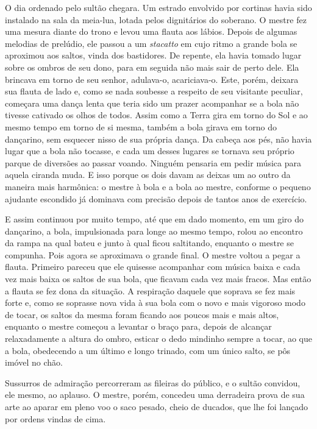 O dia ordenado pelo sultão chegara. Um estrado envolvido por cortinas
havia sido instalado na sala da meia-lua, lotada pelos dignitários do
soberano. O mestre fez uma mesura diante do trono e levou uma flauta aos
lábios. Depois de algumas melodias de prelúdio, ele passou a um
\emph{stacatto} em cujo ritmo a grande bola se aproximou aos saltos,
vinda dos bastidores. De repente, ela havia tomado lugar sobre os ombros
de seu dono, para em seguida não mais sair de perto dele. Ela brincava
em torno de seu senhor, adulava-o, acariciava-o. Este, porém, deixara
sua flauta de lado e, como se nada soubesse a respeito de seu visitante
peculiar, começara uma dança lenta que teria sido um prazer acompanhar
se a bola não tivesse cativado os olhos de todos. Assim como a Terra
gira em torno do Sol e ao mesmo tempo em torno de si mesma, também a
bola girava em torno do dançarino, sem esquecer nisso de sua própria
dança. Da cabeça aos pés, não havia lugar que a bola não tocasse, e cada
um desses lugares se tornava seu próprio parque de diversões ao passar
voando. Ninguém pensaria em pedir música para aquela ciranda muda. E
isso porque os dois davam as deixas um ao outro da maneira mais
harmônica: o mestre à bola e a bola ao mestre, conforme o pequeno
ajudante escondido já dominava com precisão depois de tantos anos de
exercício.

E assim continuou por muito tempo, até que em dado momento, em um giro
do dançarino, a bola, impulsionada para longe ao mesmo tempo, rolou ao
encontro da rampa na qual bateu e junto à qual ficou saltitando,
enquanto o mestre se compunha. Pois agora se aproximava o grande final.
O mestre voltou a pegar a flauta. Primeiro pareceu que ele quisesse
acompanhar com música baixa e cada vez mais baixa os saltos de sua bola,
que ficavam cada vez mais fracos. Mas então a flauta se fez dona da
situação. A respiração daquele que soprava se fez mais forte e, como se
soprasse nova vida à sua bola com o novo e mais vigoroso modo de tocar,
os saltos da mesma foram ficando aos poucos mais e mais altos, enquanto
o mestre começou a levantar o braço para, depois de alcançar
relaxadamente a altura do ombro, esticar o dedo mindinho sempre a tocar,
ao que a bola, obedecendo a um último e longo trinado, com um único
salto, se pôs imóvel no chão.

Sussurros de admiração percorreram as fileiras do público, e o sultão
convidou, ele mesmo, ao aplauso. O mestre, porém, concedeu uma
derradeira prova de sua arte ao aparar em pleno voo o saco pesado, cheio
de ducados, que lhe foi lançado por ordens vindas de cima.

